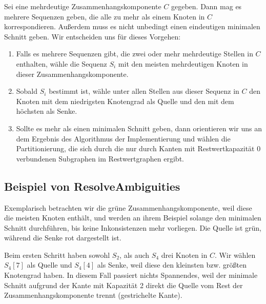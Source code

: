 Sei eine mehrdeutige Zusammenhangskomponente $C$ gegeben. Dann mag es mehrere Sequenzen geben, die alle zu mehr als einem Knoten in $C$ korrespondieren. Außerdem muss es nicht unbedingt einen eindeutigen minimalen Schnitt geben. Wir entscheiden uns für dieses Vorgehen:

\begin{enumerate}[topsep=0pt,itemsep=-1ex,partopsep=1ex,parsep=1ex]
	\item Falls es mehrere Sequenzen gibt, die zwei oder mehr mehrdeutige Stellen in $C$ enthalten, wähle die Sequenz $S_i$ mit den meisten mehrdeutigen Knoten in dieser Zusammenhangskomponente.
	\item Sobald $S_i$ bestimmt ist, wähle unter allen Stellen aus dieser Sequenz in $C$ den Knoten mit dem niedrigsten Knotengrad als Quelle und den mit dem höchsten als Senke.
	\item Sollte es mehr als einen minimalen Schnitt geben, dann orientieren wir uns an dem Ergebnis des Algorithmus der Implementierung und wählen die Partitionierung, die sich durch die nur durch Kanten mit Restwertkapazität 0 verbundenen Subgraphen im Restwertgraphen ergibt. 
\end{enumerate}

\subsection{Beispiel von \textrm{ResolveAmbiguities}}

Exemplarisch betrachten wir die grüne Zusammenhangskomponente, weil diese die meisten Knoten enthält, und werden an ihrem Beispiel solange den minimalen Schnitt durchführen, bis keine Inkonsistenzen mehr vorliegen. Die Quelle ist grün, während die Senke rot dargestellt ist.

Beim ersten Schritt haben sowohl $S_2$, als auch $S_4$ drei Knoten in $C$. Wir wählen $S_4[7]$ als Quelle und $S_4[4]$ als Senke, weil diese den kleinsten bzw. größten Knotengrad haben. In diesem Fall passiert nichts Spannendes, weil der minimale Schnitt aufgrund der Kante mit Kapazität 2 direkt die Quelle vom Rest der Zusammenhangskomponente trennt (gestrichelte Kante).

